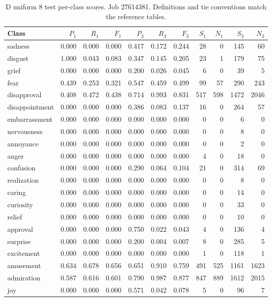 \begin{table}[!htbp]
\centering
\scriptsize
\setlength{\tabcolsep}{5pt}
\begin{tabular}{lrrrrrrrrrr}
\toprule
Class & $P_1$ & $R_1$ & $F_1$ & $P_3$ & $R_3$ & $F_3$ & $S_1$ & $N_1$ & $S_3$ & $N_3$ \\
\midrule
sadness & 0.000 & 0.000 & 0.000 & 0.417 & 0.172 & 0.244 & 28 & 0 & 145 & 60 \\
disgust & 1.000 & 0.043 & 0.083 & 0.347 & 0.145 & 0.205 & 23 & 1 & 179 & 75 \\
grief & 0.000 & 0.000 & 0.000 & 0.200 & 0.026 & 0.045 & 6 & 0 & 39 & 5 \\
fear & 0.439 & 0.253 & 0.321 & 0.547 & 0.459 & 0.499 & 99 & 57 & 290 & 243 \\
disapproval & 0.408 & 0.472 & 0.438 & 0.714 & 0.993 & 0.831 & 517 & 598 & 1472 & 2046 \\
disappointment & 0.000 & 0.000 & 0.000 & 0.386 & 0.083 & 0.137 & 16 & 0 & 264 & 57 \\
embarrassment & 0.000 & 0.000 & 0.000 & 0.000 & 0.000 & 0.000 & 0 & 0 & 6 & 0 \\
nervousness & 0.000 & 0.000 & 0.000 & 0.000 & 0.000 & 0.000 & 0 & 0 & 8 & 0 \\
annoyance & 0.000 & 0.000 & 0.000 & 0.000 & 0.000 & 0.000 & 0 & 0 & 2 & 0 \\
anger & 0.000 & 0.000 & 0.000 & 0.000 & 0.000 & 0.000 & 4 & 0 & 18 & 0 \\
confusion & 0.000 & 0.000 & 0.000 & 0.290 & 0.064 & 0.104 & 21 & 0 & 314 & 69 \\
realization & 0.000 & 0.000 & 0.000 & 0.000 & 0.000 & 0.000 & 0 & 0 & 8 & 0 \\
caring & 0.000 & 0.000 & 0.000 & 0.000 & 0.000 & 0.000 & 0 & 0 & 14 & 0 \\
curiosity & 0.000 & 0.000 & 0.000 & 0.000 & 0.000 & 0.000 & 0 & 0 & 33 & 0 \\
relief & 0.000 & 0.000 & 0.000 & 0.000 & 0.000 & 0.000 & 0 & 0 & 10 & 0 \\
approval & 0.000 & 0.000 & 0.000 & 0.750 & 0.022 & 0.043 & 4 & 0 & 136 & 4 \\
surprise & 0.000 & 0.000 & 0.000 & 0.200 & 0.004 & 0.007 & 8 & 0 & 285 & 5 \\
excitement & 0.000 & 0.000 & 0.000 & 0.000 & 0.000 & 0.000 & 1 & 0 & 118 & 1 \\
amusement & 0.634 & 0.678 & 0.656 & 0.651 & 0.910 & 0.759 & 491 & 525 & 1161 & 1623 \\
admiration & 0.587 & 0.616 & 0.601 & 0.790 & 0.987 & 0.877 & 847 & 889 & 1612 & 2015 \\
joy & 0.000 & 0.000 & 0.000 & 0.571 & 0.042 & 0.078 & 5 & 0 & 96 & 7 \\
\bottomrule
\end{tabular}
\caption{D uniform 8 test per-class scores. Job 27614381. Definitions and tie conventions match the reference tables.}
\label{tab:classes-d_uniform_k8}
\end{table}
